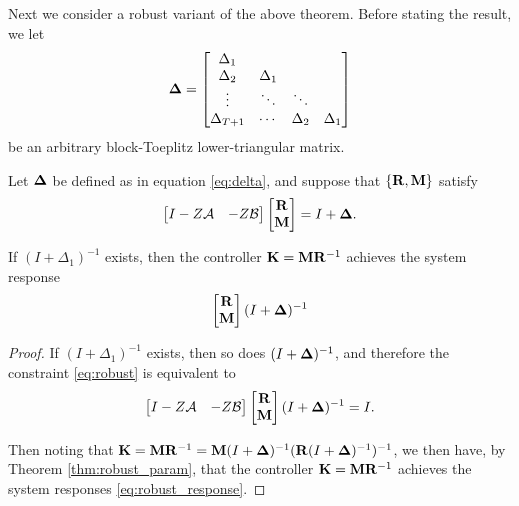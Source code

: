 \documentclass[11pt]{article}
\numberwithin{equation}{section}
\begin{document}
Next we consider a robust variant of the above theorem.  Before stating the result, we let
\begin{equation}
\mathbf{\Delta} = \begin{bmatrix} \Delta_1 & & & \\ \Delta_2 & \Delta_1 & & \\ \vdots & \ddots & \ddots & \\  \Delta_{T+1} & \cdots & \Delta_2 & \Delta_1 \end{bmatrix}
\label{eq:delta}
\end{equation}
be an arbitrary block-Toeplitz lower-triangular matrix.

\begin{theorem}
Let $\mathbf{\Delta}$ be defined as in equation \eqref{eq:delta}, and suppose that  $\{\mathbf{R}, \mathbf{M}\}$ satisfy
\begin{equation}
\begin{bmatrix}I - Z\mathcal{A} & -Z\mathcal{B} \end{bmatrix}\begin{bmatrix} \mathbf{R} \\ \mathbf{M} \end{bmatrix} = I + \mathbf{\Delta}.
\label{eq:robust}
\end{equation}

If $(I+\Delta_1)^{-1}$ exists, then the controller $\mathbf{K} = \mathbf{M} \mathbf{R}^{-1}$ achieves the system response
\begin{equation}
\begin{bmatrix}
\mathbf{R} \\ \mathbf{M} \end{bmatrix} (I + \mathbf{\Delta})^{-1}
\label{eq:robust_response}
\end{equation}
\end{theorem}
\begin{proof}
If $(I+\Delta_1)^{-1}$ exists, then so does $(I + \mathbf{\Delta})^{-1}$, and therefore the constraint \eqref{eq:robust} is equivalent to
\begin{equation}
\begin{bmatrix}I - Z\mathcal{A} & -Z\mathcal{B} \end{bmatrix}\begin{bmatrix} \mathbf{R} \\ \mathbf{M} \end{bmatrix}(I + \mathbf{\Delta})^{-1} = I.
\end{equation}

Then noting that $\mathbf{K} = \mathbf{M} \mathbf{R}^{-1} = \mathbf{M} (I + \mathbf{\Delta})^{-1} (\mathbf{R} (I + \mathbf{\Delta})^{-1})^{-1} $, we then have, by Theorem \ref{thm:robust_param}, that the controller $\mathbf{K} =  \mathbf{M} \mathbf{R}^{-1} $ achieves the system responses \eqref{eq:robust_response}.
\end{proof}
\end{document}
